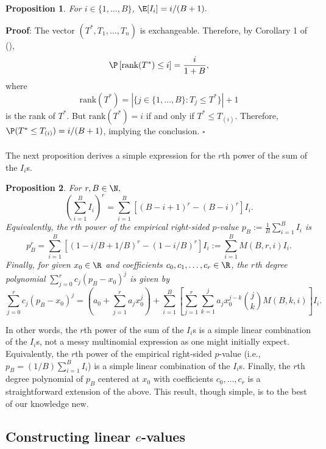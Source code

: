 \documentclass[12pt]{article}
\newtheorem{proposition}{Proposition}
\begin{document}
\begin{proposition}
For $i \in \{1, \dots, B\}$, $\E[I_i] = i/(B+1).$
\end{proposition}
\textbf{Proof}: The vector $(T^*, T_1, \dots, T_n)$ is exchangeable. Therefore, by Corollary 1 of (\cite{Kuchibhotla2020}),  $$\P\left[\textrm{rank}(T^*) \leq i\right] = \frac{i}{1+B},$$ where $$\textrm{rank}(T^*) = | \{ j \in \{1, \dots, B\} :  T_j \leq T^*  \} | + 1$$ is the rank of $T^*$. But $\textrm{rank}(T^*) = i$ if and only if $T^* \leq T_{(i)}$. Therefore, $\P( T^* \leq T_{(i)}) = i/(B+1)$, implying the conclusion. $\square$
\\ \\
The next proposition derives a simple expression for the $r$th power of the sum of the $I_i$s.
\begin{proposition}\label{thm:power_of_is}
For $r,B \in \N,$
$$ \left(\sum_{i=1}^B I_i\right)^r = \sum_{i=1}^B \left[ (B - i + 1)^r - (B - i)^r \right] I_i.$$ Equivalently, the $r$th power of the empirical right-sided $p$-value $p_B := \frac{1}{B} \sum_{i=1}^B  I_i $ is $$ p_B^r = \sum_{i=1}^B \left[ (1 - i/B + 1/B)^r - (1 - i/B)^r \right]I_i := \sum_{i=1}^B M(B,r,i) I_i.$$ Finally, for given $x_0 \in \R$ and coefficients $c_0, c_1, \dots, c_r \in \R$, the $r$th degree polynomial $\sum_{j=0}^r c_j(p_B - x_0)^j$ is given by
$$
\sum_{j=0}^r c_j(p_B - x_0)^j = \left( a_0 + \sum_{j=1}^r a_j x_0^j \right) + \sum_{i=1}^B \left[ \sum_{j=1}^r \sum_{k=1}^j a_j x^{j-k}_0 \binom{j}{k} M( B,k,i ) \right] I_i.
$$
\end{proposition}
In other words, the $r$th power of the sum of the $I_i$s is a simple linear combination of the $I_i$s, not a messy multinomial expression as one might initially expect. Equivalently, the $r$th power of the empirical right-sided $p$-value (i.e., $p_B = (1/B) \sum_{i=1}^B I_i$) is a simple linear combination of the $I_i$s. Finally, the $r$th degree polynomial of $p_B$ centered at $x_0$ with coefficients $c_0, \dots, c_r$ is a straightforward extension of the above. This result, though simple, is to the best of our knowledge new.

\subsection*{Constructing linear $e$-values}
\end{document}
